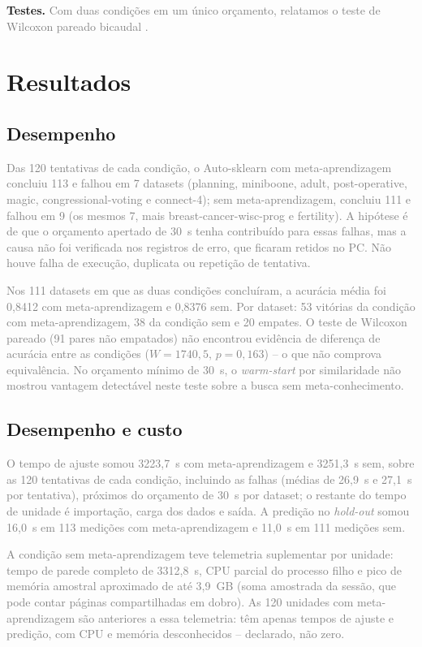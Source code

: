 \documentclass[10pt]{article}
\newcommand{\pend}[1]{}
\newcommand{\editinst}[1]{\textcolor{gray}{#1}}
\begin{document}
\textbf{Testes.} \editinst{Com duas condições em um único orçamento, relatamos o teste de Wilcoxon pareado bicaudal \cite{demsar2006statistical}.}

\section{Resultados}\label{sec:resultados}

\subsection{Desempenho}
\editinst{Das 120 tentativas de cada condição, o Auto-sklearn com meta-aprendizagem concluiu 113 e falhou em 7 datasets (planning, miniboone, adult, post-operative, magic, congressional-voting e connect-4); sem meta-aprendizagem, concluiu 111 e falhou em 9 (os mesmos 7, mais breast-cancer-wisc-prog e fertility). A hipótese é de que o orçamento apertado de 30~s tenha contribuído para essas falhas, mas a causa não foi verificada nos registros de erro, que ficaram retidos no PC. Não houve falha de execução, duplicata ou repetição de tentativa.}

\editinst{Nos 111 datasets em que as duas condições concluíram, a acurácia média foi 0{,}8412 com meta-aprendizagem e 0{,}8376 sem. Por dataset: 53 vitórias da condição com meta-aprendizagem, 38 da condição sem e 20 empates. O teste de Wilcoxon pareado (91 pares não empatados) não encontrou evidência de diferença de acurácia entre as condições ($W = 1740{,}5$, $p = 0{,}163$) -- o que não comprova equivalência. No orçamento mínimo de 30~s, o \textit{warm-start} por similaridade não mostrou vantagem detectável neste teste sobre a busca sem meta-conhecimento.}
\pend{[Incluir os braços de meta-aprendizagem da Atividade 3 quando os artefatos corrigidos estiverem disponíveis.]}

\subsection{Desempenho e custo}
\editinst{O tempo de ajuste somou 3223{,}7~s com meta-aprendizagem e 3251{,}3~s sem, sobre as 120 tentativas de cada condição, incluindo as falhas (médias de 26{,}9~s e 27{,}1~s por tentativa), próximos do orçamento de 30~s por dataset; o restante do tempo de unidade é importação, carga dos dados e saída. A predição no \textit{hold-out} somou 16{,}0~s em 113 medições com meta-aprendizagem e 11{,}0~s em 111 medições sem.}

\editinst{A condição sem meta-aprendizagem teve telemetria suplementar por unidade: tempo de parede completo de 3312{,}8~s, CPU parcial do processo filho e pico de memória amostral aproximado de até 3{,}9~GB (soma amostrada da sessão, que pode contar páginas compartilhadas em dobro). As 120 unidades com meta-aprendizagem são anteriores a essa telemetria: têm apenas tempos de ajuste e predição, com CPU e memória desconhecidos -- declarado, não zero.}
\pend{[Custo online da meta-aprendizagem da Atividade 3 (meta-características do alvo, consulta e busca) separado do custo offline, após a correção dos artefatos.]}
\end{document}
